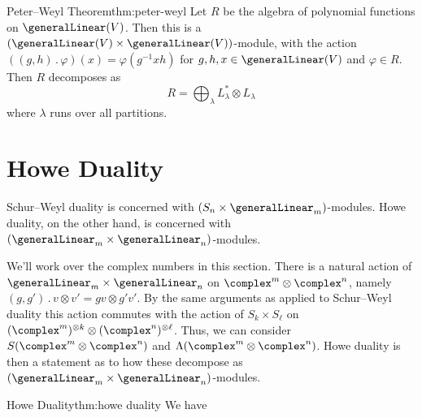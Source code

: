 \documentclass[fleqn]{NotesClass}
\newcommand{\action}{\mathbin{.}}
\newcommand{\isomorphic}{\cong}
\begin{document}
    \begin{thm}{Peter--Weyl Theorem}{thm:peter-weyl}
        Let \(R\) be the algebra of polynomial functions on \(\generalLinear(V)\).
        Then this is a \((\generalLinear(V) \times \generalLinear(V))\)-module, with the action \(((g, h) \action \varphi)(x) = \varphi(g^{-1}xh)\) for \(g, h, x \in \generalLinear(V)\) and \(\varphi \in R\).
        Then \(R\) decomposes as
        \begin{equation}
            R = \bigoplus_{\lambda} L_\lambda^* \otimes L_\lambda
        \end{equation}
        where \(\lambda\) runs over all partitions.
    \end{thm}
    
    \section{Howe Duality}
    Schur--Weyl duality is concerned with \((S_n \times \generalLinear_m)\)-modules.
    Howe duality, on the other hand, is concerned with \((\generalLinear_m \times \generalLinear_n)\)-modules.
    
    We'll work over the complex numbers in this section.
    There is a natural action of \(\generalLinear_m \times \generalLinear_n\) on \(\complex^m \otimes \complex^n\), namely \((g, g') \action v \otimes v' = gv \otimes g'v'\).
    By the same arguments as applied to Schur--Weyl duality this action commutes with the action of \(S_k \times S_\ell\) on \((\complex^m)^{\otimes k} \otimes (\complex^n)^{\otimes \ell}\).
    Thus, we can consider \(S(\complex^m \otimes \complex^n)\) and \(\Lambda(\complex^m \otimes \complex^n)\).
    Howe duality is then a statement as to how these decompose as \((\generalLinear_m \times \generalLinear_n)\)-modules.
    
    \begin{thm}{Howe Duality}{thm:howe duality}
        We have
    \end{thm}
    
\end{document}
